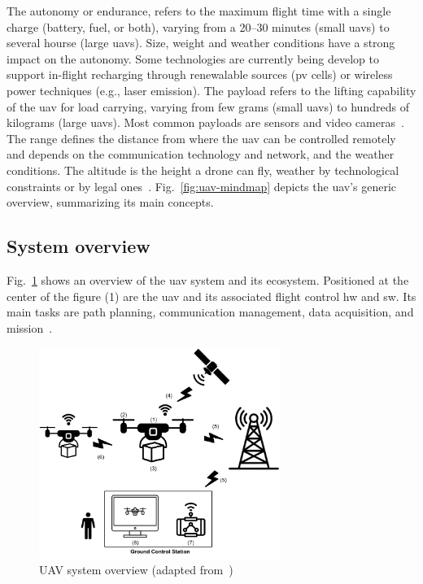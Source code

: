 The autonomy or endurance, refers to the maximum flight time with a
single charge (battery, fuel, or both), varying from a 20--30 minutes (small \glspl{uav}) to several
hourse (large \glspl{uav}). Size, weight and weather conditions have a strong
impact on the autonomy. Some technologies are currently being develop to support
in-flight recharging through renewalable sources (\gls{pv} cells) or wireless
power techniques (e.g., laser emission)\cite{mohsan2022towards}.
The payload refers to the lifting capability of the \gls{uav} for load carrying,
varying from few grams (small \glspl{uav}) to hundreds of kilograms (large
\glspl{uav}). Most common payloads are sensors and video cameras~\cite{mohsan2022towards}.
The range defines the distance from where the \gls{uav} can be controlled
remotely and depends on the communication technology and network, and the
weather conditions\cite{mohsan2022towards}. The altitude is the height a drone can fly, weather by
technological constraints or by legal ones~\cite{mohsan2022towards}.
%
Fig.~\ref{fig:uav-mindmap} depicts the \gls{uav}'s
generic overview, summarizing its main concepts.
%
%
\subsection{System overview}%
\label{sec:system-overview}
Fig.~\ref{fig:uav-sysOverv} shows an overview of the \gls{uav} system and its
ecosystem.
Positioned at the center of the figure (1) are the \gls{uav} and its associated flight control \gls{hw} and \gls{sw}.
Its main tasks are path planning, communication
management, data acquisition, and mission~\cite{aggarwal2020UAVPathPlanning}.

\begin{figure}[!hbt]
  \centering
  \includegraphics[width=0.7\textwidth]{./img/pdf/uav-sys-overv.pdf} 
%   
  \caption[UAV system overview]{UAV system overview (adapted from~\cite{mohsan2022towards,aggarwal2020UAVPathPlanning})}%
  \label{fig:uav-sysOverv}
\end{figure}

